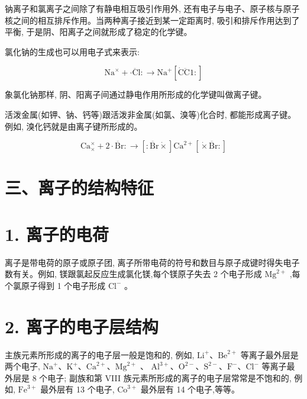 \documentclass[10pt]{article}
\begin{document}
钠离子和氯离子之间除了有静电相互吸引作用外, 还有电子与电子、原子核与原子核之间的相互排斥作用。当两种离子接近到某一定距离时, 吸引和排斥作用达到了平衡, 于是阴、阳离子之间就形成了稳定的化学键。

氯化钠的生成也可以用电子式来表示:

\[
{\mathrm{{Na}}}^{ \times } + \cdot \ddot{\mathrm{{Cl}}} : \rightarrow {\mathrm{{Na}}}^{ + }\left\lbrack {\dot{\mathrm{C}}\ddot{\mathrm{C}}1 : }\right\rbrack
\]

象氯化钠那样, 阴、阳离子间通过静电作用所形成的化学键叫做离子键。

活泼金属(如钾、钠、钙等)跟活泼非金属(如氯、溴等)化合时, 都能形成离子键。例如, 溴化钙就是由离子键所形成的。

\[
{\mathrm{{Ca}}}_{ \times }^{ \times } + 2 \cdot \ddot{\mathrm{{Br}}} : \rightarrow \left\lbrack { : \ddot{\mathrm{{Br}}}\dot{ \times }}\right\rbrack {\mathrm{{Ca}}}^{2 + }\left\lbrack {\dot{ \times }\ddot{\mathrm{{Br}}} : }\right\rbrack
\]

\section*{三、离子的结构特征}

\section*{1. 离子的电荷}

离子是带电荷的原子或原子团, 离子所带电荷的符号和数目与原子成键时得失电子数有关。例如, 镁跟氯起反应生成氯化镁,每个镁原子失去 2 个电子形成 \({\mathrm{{Mg}}}^{2 + }\) ,每个氯原子得到 1 个电子形成 \({\mathrm{{Cl}}}^{ - }\) 。

\section*{2. 离子的电子层结构}

主族元素所形成的离子的电子层一般是饱和的, 例如, \({\mathrm{{Li}}}^{ + }\text{、}{\mathrm{{Be}}}^{2 + }\) 等离子最外层是两个电子, \({\mathrm{{Na}}}^{ + }\text{、}{\mathrm{K}}^{ + }\text{、}{\mathrm{{Ca}}}^{2 + }\text{、}{\mathrm{{Mg}}}^{2 + }\) 、 \({\mathrm{{Al}}}^{3 + }\text{、}{\mathrm{O}}^{2 - }\text{、}{\mathrm{S}}^{2 - }\text{、}{\mathrm{F}}^{ - }\text{、}{\mathrm{{Cl}}}^{ - }\) 等离子最外层是 8 个电子; 副族和第 VIII 族元素所形成的离子的电子层常常是不饱和的, 例如, \({\mathrm{{Fe}}}^{3 + }\) 最外层有 13 个电子, \({\mathrm{{Co}}}^{3 + }\) 最外层有 14 个电子,等等。
\end{document}
